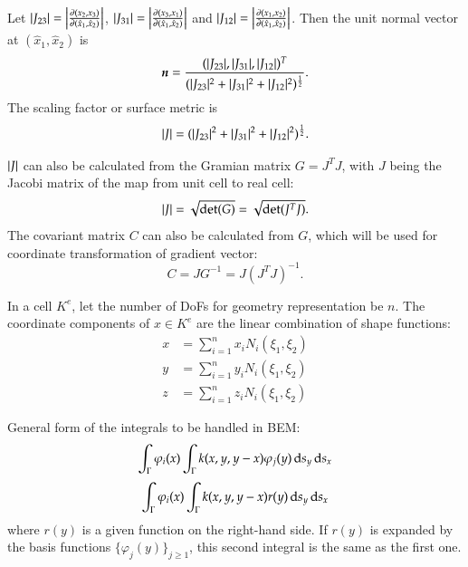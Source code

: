 \documentclass[11pt, a4paper]{book}
\begin{document}
Let $\lvert J_{23}\rvert = \left\vert \frac{\partial (x_2,x_3)}{\partial (\hat{x}_1,\hat{x}_2)}\right\vert$,
$\lvert J_{31}\rvert = \left\vert \frac{\partial (x_3,x_1)}{\partial (\hat{x}_1,\hat{x}_2)}\right\vert$ and
$\lvert J_{12}\rvert = \left\vert \frac{\partial (x_1,x_2)}{\partial (\hat{x}_1,\hat{x}_2)}\right\vert$. Then
the unit normal vector at $(\hat{x}_1,\hat{x}_2)$ is
\begin{equation}
  \label{eq:surface-normal-vector}
  \boldsymbol{n} = \frac{(\lvert J_{23}\rvert,\lvert J_{31}\rvert,\lvert J_{12}\rvert)^T}{(\lvert J_{23}\rvert^2+\lvert J_{31}\rvert^2+\lvert J_{12}\rvert^2)^{\frac{1}{2}}}.
\end{equation}
The scaling factor or surface metric is
\begin{equation}
  \label{eq:surface-metric}
  \lvert J\rvert = (\lvert J_{23}\rvert^2+\lvert J_{31}\rvert^2+\lvert J_{12}\rvert^2)^{\frac{1}{2}}.
\end{equation}

$\lvert J\rvert$ can also be calculated from the Gramian matrix $G = J^TJ$, with $J$ being the
Jacobi matrix of the map from unit cell to real cell:
\begin{equation}
  \label{eq:surface-metric-from-gramian-matrix}
  \lvert J\rvert = \sqrt{\det(G)} = \sqrt{\det(J^TJ)}.
\end{equation}
The covariant matrix $C$ can also be calculated from $G$, which will be used for
coordinate transformation of gradient vector:
\begin{equation}
  \label{eq:covariant-matrix}
  C = J G^{-1} = J(J^TJ)^{-1}.
\end{equation}

In a cell $K^e$, let the number of DoFs for geometry representation be $n$. The coordinate
components of $x\in K^e$ are the linear combination of shape functions:
\begin{equation}
  \begin{split}
    x &= \sum_{i=1}^n x_iN_i(\xi_1,\xi_2) \\
    y &= \sum_{i=1}^n y_iN_i(\xi_1,\xi_2) \\
    z &= \sum_{i=1}^n z_iN_i(\xi_1,\xi_2)
  \end{split}
\end{equation}

General form of the integrals to be handled in BEM:
\begin{equation}
  \int_{\Gamma} \varphi_i(x) \int_{\Gamma}k(x,y,y-x) \varphi_j(y) \,\mathrm{d} s_y \,\mathrm{d} s_x
\end{equation}
\begin{equation}
  \int_{\Gamma}\varphi_i(x)\int_{\Gamma}k(x,y,y-x)r(y) \,\mathrm{d} s_y \,\mathrm{d} s_x
\end{equation}
where $r(y)$ is a given function on the right-hand side. If $r(y)$ is expanded by the basis
functions $\{\varphi_j(y)\}_{j\geq 1}$, this second integral is the same as the first one.
\end{document}
